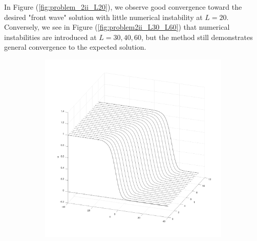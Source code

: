 \begin{solution}
    In Figure (\ref{fig:problem_2ii_L20}), we observe good convergence toward 
    the desired "front wave" solution with little numerical instability at $L = 20$. Conversely, we see in Figure 
    (\ref{fig:problem2ii_L30_L60}) that numerical instabilities are introduced at $L = 30,40,60$, but the method still 
    demonstrates general convergence to the expected solution.

    \begin{figure}[h]
        \centering
        \begin{subfigure}[b]{0.49\textwidth}
            \centering
            \includegraphics[width=\textwidth]{problem_2ii_L40.png}
        \end{subfigure}
        \hfill
        \begin{subfigure}[b]{0.49\textwidth}
            \centering

\end{subfigure}
\end{figure}
\end{solution}
